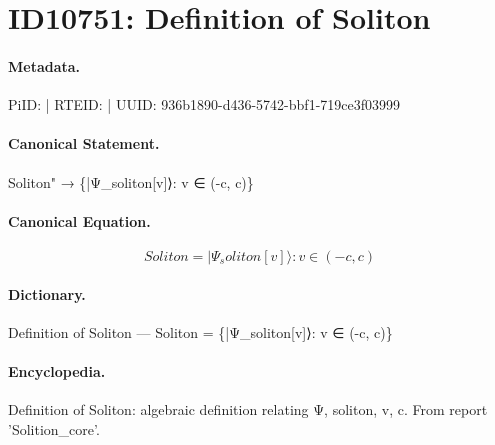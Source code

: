\section*{ID10751: Definition of Soliton}
\paragraph{Metadata.}
PiID:  | RTEID:  | UUID: 936b1890-d436-5742-bbf1-719ce3f03999

\paragraph{Canonical Statement.}
Soliton" → \{|Ψ\_soliton[v]⟩: v ∈ (-c, c)\}

\paragraph{Canonical Equation.}
\[
Soliton = {|Ψ_soliton[v]⟩: v ∈ (-c, c)}
\]

\paragraph{Dictionary.}
Definition of Soliton — Soliton = \{|Ψ\_soliton[v]⟩: v ∈ (-c, c)\}

\paragraph{Encyclopedia.}
Definition of Soliton: algebraic definition relating Ψ, soliton, v, c. From report 'Solition\_core'.
